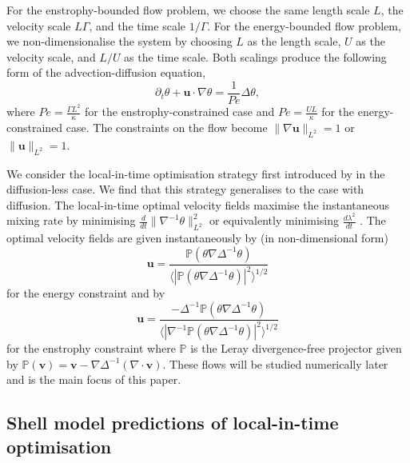 \documentclass[12pt]{iopart}
\newcommand{\ddt}[1]{\frac{d #1}{dt}}
\newcommand{\hmone}[1]{\|\nabla^{-1} #1\|_{L^{2}}}
\newcommand{\ltwo}[1]{\|#1\|_{L^{2}}}
\renewcommand{\vec}[1]{\mathbf{#1}}
\renewcommand{\u}{\mathbf{u}}
\newcommand{\ppt}[1]{\partial_{t} #1}
\newcommand{\lap}{\Delta }
\newcommand{\invlap}{\Delta^{-1}}
\begin{document}
For the enstrophy-bounded flow problem, we choose the same length scale $L$, the velocity scale $L\Gamma $, and  the time scale $1/\Gamma$. For the energy-bounded flow problem, we non-dimensionalise the system by choosing $L$ as the length scale, $U$ as the velocity scale, and $L/U$ as the time scale.  Both scalings produce the following form of the advection-diffusion equation,
\begin{equation}
\label{eq:nd_ade}
	\ppt{\theta}+\mathbf{u}\cdot \nabla \theta=\frac{1}{Pe} \lap\theta,
\end{equation}
where $Pe=  \frac{\Gamma L^2}{\kappa}$ for the enstrophy-constrained case and $Pe= \frac{UL}{\kappa}$ for the energy-constrained case.   The constraints on the flow become $\ltwo{\nabla\u} = 1$ or $\ltwo{\u} = 1$.



We consider the local-in-time optimisation strategy first introduced by \cite{JFM2011} in the diffusion-less case. We find that this strategy generalises to the case with diffusion. The local-in-time optimal velocity fields maximise the instantaneous mixing rate by minimising $\ddt{}\hmone{\theta}^2$ or equivalently minimising $\ddt{\lambda^2}$ . The optimal velocity fields are given instantaneously by (in non-dimensional form)
%
\begin{equation}
\mathbf{u}= \frac{\mathds{P}(\theta \nabla \invlap\theta)}{\langle |\mathds{P}(\theta \nabla \invlap\theta)|^2\rangle^{1/2}}
\end{equation} 
%
for the energy constraint and by 
%
\begin{equation}
\mathbf{u}= \frac{-\invlap\mathds{P}(\theta \nabla \invlap\theta)}{\langle |\nabla^{-1}\mathds{P}(\theta \nabla \invlap\theta)|^2\rangle^{1/2}}
\end{equation}
%
for the enstrophy constraint where $\mathds{P}$ is the Leray divergence-free projector given by $\mathds{P}(\vec{v}) = \vec{v} - \nabla \Delta^{-1}(\nabla \cdot \vec{v})$. These flows will be studied numerically later and is the main focus of this paper.


\subsection{Shell model predictions of local-in-time optimisation}
\end{document}

